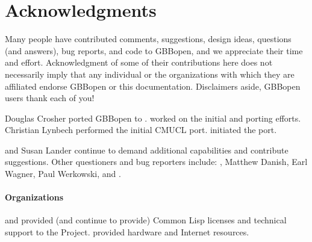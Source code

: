 


\section*{Acknowledgments}
\T{}%
\label{sec:acknowledgments}%
%

Many people have contributed comments, suggestions, design ideas, questions
(and answers), bug reports, and code to GBBopen, and we appreciate their time
and effort.  Acknowledgment of some of their contributions here does not
necessarily imply that any individual or the organizations with which they are
affiliated endorse GBBopen or this documentation.  Disclaimers aside, GBBopen
users thank each of you!

Douglas Crosher ported GBBopen to .   worked on the initial  and
 porting efforts.
Christian Lynbech performed the initial CMUCL port.   initiated the
 port.

 and
Susan Lander continue to demand additional capabilities and contribute
suggestions.  Other questioners and bug reporters include:
, Matthew
Danish, Earl Wagner, Paul Werkowski, and .

\paragraph{Organizations}

 and  provided (and continue to provide)
Common Lisp licenses and technical support to the Project.
 provided hardware
and Internet resources.  

